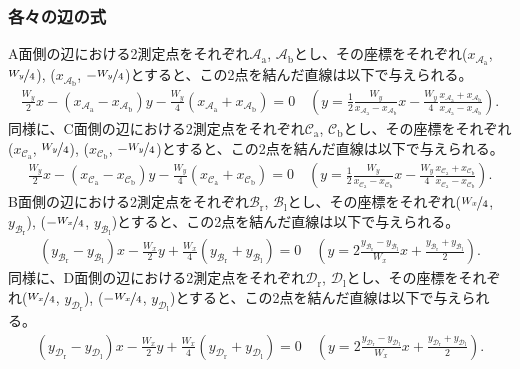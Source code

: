 \subsubsection{各々の辺の式}
A面側の辺における2測定点をそれぞれ$\mathcal A_\mathrm a$, $\mathcal A_\mathrm b$とし、その座標をそれぞれ($x_{\mathcal A_\mathrm a}$, $\nicefrac{W_y}4$), ($x_{\mathcal A_\mathrm b}$, $-\nicefrac{W_y}4$)とすると、この2点を結んだ直線は以下で与えられる。
\begin{align*}
  \frac{W_y}2x
  -\left(x_{\mathcal A_\mathrm a}-x_{\mathcal A_\mathrm b}\right)y
  -\frac{W_y}4\left(x_{\mathcal A_\mathrm a}+x_{\mathcal A_\mathrm b}\right)
  = 0\quad
  \left(
    y = \frac12\frac{W_y}{x_{\mathcal A_\mathrm a}-x_{\mathcal A_\mathrm b}}x
        -\frac{W_y}4\frac{x_{\mathcal A_\mathrm a}+x_{\mathcal A_\mathrm b}}
                         {x_{\mathcal A_\mathrm a}-x_{\mathcal A_\mathrm b}}
  \right).
\end{align*}
同様に、C面側の辺における2測定点をそれぞれ$\mathcal C_\mathrm a$, $\mathcal C_\mathrm b$とし、その座標をそれぞれ($x_{\mathcal C_\mathrm a}$, $\nicefrac{W_y}4$), ($x_{\mathcal C_\mathrm b}$, $-\nicefrac{W_y}4$)とすると、この2点を結んだ直線は以下で与えられる。
\begin{align*}
  \frac{W_y}2x
  -\left(x_{\mathcal C_\mathrm a}-x_{\mathcal C_\mathrm b}\right)y
  -\frac{W_y}4\left(x_{\mathcal C_\mathrm a}+x_{\mathcal C_\mathrm b}\right)
  = 0\quad
  \left(
    y = \frac12\frac{W_y}{x_{\mathcal C_\mathrm a}-x_{\mathcal C_\mathrm b}}x
        -\frac{W_y}4\frac{x_{\mathcal C_\mathrm a}+x_{\mathcal C_\mathrm b}}
                         {x_{\mathcal C_\mathrm a}-x_{\mathcal C_\mathrm b}}
  \right).
\end{align*}
B面側の辺における2測定点をそれぞれ$\mathcal B_\mathrm r$, $\mathcal B_\mathrm l$とし、その座標をそれぞれ($\nicefrac{W_x}4$, $y_{\mathcal B_\mathrm r}$), ($-\nicefrac{W_x}4$, $y_{\mathcal B_\mathrm l}$)とすると、この2点を結んだ直線は以下で与えられる。
\begin{align*}
  \left(y_{\mathcal B_\mathrm r}-y_{\mathcal B_\mathrm l}\right)x
  -\frac{W_x}2y
  +\frac{W_x}4\left(y_{\mathcal B_\mathrm r}+y_{\mathcal B_\mathrm l}\right)
  = 0\quad
  \left(
    y = 2\frac{y_{\mathcal B_\mathrm r}-y_{\mathcal B_\mathrm l}}{W_x}x
        +\frac{y_{\mathcal B_\mathrm r}+y_{\mathcal B_\mathrm l}}2
  \right).
\end{align*}
同様に、D面側の辺における2測定点をそれぞれ$\mathcal D_\mathrm r$, $\mathcal D_\mathrm l$とし、その座標をそれぞれ($\nicefrac{W_x}4$, $y_{\mathcal D_\mathrm r}$), ($-\nicefrac{W_x}4$, $y_{\mathcal D_\mathrm l}$)とすると、この2点を結んだ直線は以下で与えられる。
\begin{align*}
  \left(y_{\mathcal D_\mathrm r}-y_{\mathcal D_\mathrm l}\right)x
  -\frac{W_x}2y
  +\frac{W_x}4\left(y_{\mathcal D_\mathrm r}+y_{\mathcal D_\mathrm l}\right)
  = 0\quad
  \left(
    y = 2\frac{y_{\mathcal D_\mathrm r}-y_{\mathcal D_\mathrm l}}{W_x}x
        +\frac{y_{\mathcal D_\mathrm r}+y_{\mathcal D_\mathrm l}}2
  \right).
\end{align*}

